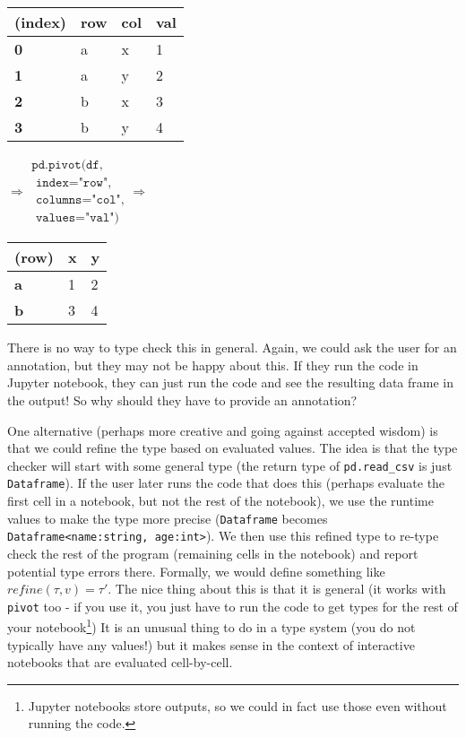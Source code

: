 \documentclass{article}
\begin{document}
\vspace{1em}
\hspace{-1em}
\begin{tabular}{llll}
\textbf{(index)} & \textbf{row} & \textbf{col} & \textbf{val}  \\ \hline
\textbf{0} & a   & x   & 1    \\
\textbf{1} & a   & y   & 2    \\
\textbf{2} & b   & x   & 3    \\
\textbf{3} & b   & y   & 4
\end{tabular}
\quad
$\Rightarrow
\begin{array}{l}
\texttt{pd.pivot(df,}\\
\texttt{    index="row",}\\
\texttt{    columns="col",} \\
\texttt{    values="val")}
\end{array}
\Rightarrow$
\qquad
\begin{tabular}{lll}
\textbf{(row)} & \textbf{x} & \textbf{y} \\ \hline
\textbf{a} & 1 & 2 \\
\textbf{b} & 3 & 4 \\
\end{tabular}
\vspace{1em}

There is no way to type check this in general. Again, we could ask the user for an annotation,
but they may not be happy about this. If they run the code in Jupyter notebook, they can just
run the code and see the resulting data frame in the output! So why should they have to provide
an annotation?

One alternative (perhaps more creative and going against accepted wisdom) is that we could
refine the type based on evaluated values. The idea is that the type checker will start with some
general type (the return type of \texttt{pd.read\_csv} is just \texttt{Dataframe}). If the user
later runs the code that does this (perhaps evaluate the first cell in a notebook, but not the
rest of the notebook), we use the runtime values to make the type more precise (\texttt{Dataframe}
becomes \texttt{Dataframe<name:string, age:int>}). We then use this refined type to re-type check
the rest of the program (remaining cells in the notebook) and report potential type errors there.
Formally, we would define something like $\mathit{refine}(\tau, v) = \tau'$. The nice thing about
this is that it is general (it works with \texttt{pivot} too - if you use it, you just have to run
the code to get types for the rest of your notebook\footnote{Jupyter notebooks store outputs, so we
could in fact use those even without running the code.}) It is an unusual thing to do in a type
system (you do not typically have any values!) but it makes sense in the context of interactive
notebooks that are evaluated cell-by-cell.
\end{document}
